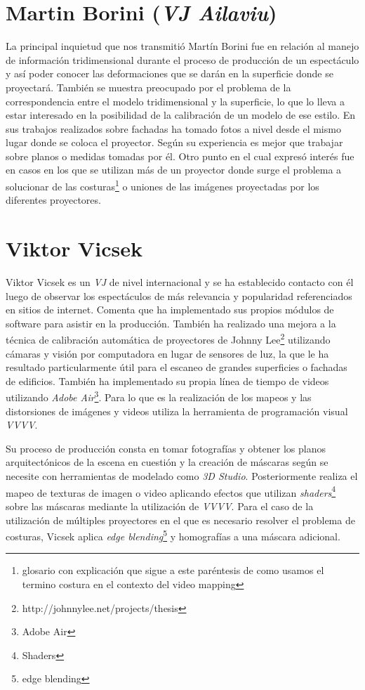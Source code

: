 \section{Martin Borini (\emph{VJ Ailaviu})}
La principal inquietud que nos transmitió Martín Borini \cite{Ailaviu} fue en relación al manejo de información tridimensional durante el proceso de producción de un espectáculo y así poder conocer las deformaciones que se darán en la superficie donde se proyectará. También se muestra preocupado por el problema de la correspondencia entre el modelo tridimensional y la superficie, lo que lo lleva a estar interesado en la posibilidad de la calibración de un modelo de ese estilo.
En sus trabajos realizados sobre fachadas ha tomado fotos a nivel desde el mismo lugar donde se coloca el proyector. Según su experiencia es mejor que trabajar sobre planos o medidas tomadas por él. Otro punto en el cual expresó interés fue en casos en los que se utilizan más de un proyector donde surge el problema a solucionar de las costuras\footnote{glosario con explicación que sigue a este paréntesis de como usamos el termino costura en el contexto del video mapping} o uniones de las imágenes proyectadas por los diferentes proyectores.

\section{Viktor Vicsek}
Viktor Vicsek \cite{Viktorvicsek} es un \emph{VJ} de nivel internacional y se ha establecido contacto con él luego de observar los espectáculos de más relevancia y popularidad referenciados en sitios de internet. Comenta que ha implementado sus propios módulos de software para asistir en la producción. También ha realizado una mejora a la técnica de calibración automática de proyectores de Johnny Lee\footnote{http://johnnylee.net/projects/thesis} utilizando cámaras y visión por computadora en lugar de sensores de luz, la que le ha resultado particularmente útil para el escaneo de grandes superficies o fachadas de edificios. También ha implementado su propia línea de tiempo de videos utilizando \emph{Adobe Air}\footnote{Adobe Air}. Para lo que es la realización de los mapeos y las distorsiones de imágenes y videos utiliza la herramienta de programación visual \emph{VVVV}.

Su proceso de producción consta en tomar fotografías y obtener los planos arquitectónicos de la escena en cuestión y la creación de máscaras según se necesite con herramientas de modelado como \emph{3D Studio}. Posteriormente realiza el mapeo de texturas de imagen o video aplicando efectos que utilizan \emph{shaders}\footnote{Shaders} sobre las máscaras mediante la utilización de \emph{VVVV}. Para el caso de la utilización de múltiples proyectores en el que es necesario resolver el problema de costuras, Vicsek aplica \emph{edge blending}\footnote{edge blending} y homografías a una máscara adicional.

